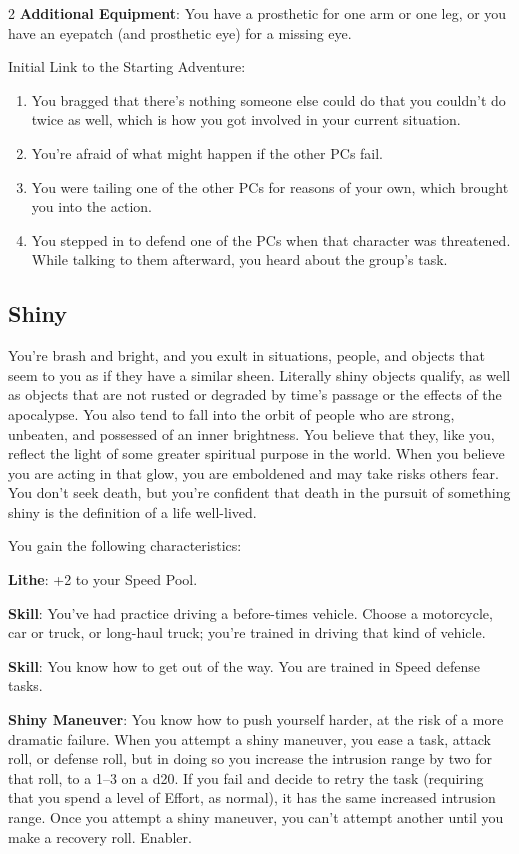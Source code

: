 \begin{multicols}{2}
\textbf{Additional Equipment}: You have a prosthetic for one arm or one leg, or you have an eyepatch (and prosthetic eye) for a missing eye.

Initial Link to the Starting Adventure:
\begin{enumerate}
\item  You bragged that there’s nothing someone else could do that you couldn’t do twice as well, which is how you got involved in your current situation.
\item  You’re afraid of what might happen if the other PCs fail.
\item  You were tailing one of the other PCs for reasons of your own, which brought you into the action.
\item  You stepped in to defend one of the PCs when that character was threatened. While talking to them afterward, you heard about the group’s task.
\end{enumerate}

\subsection{Shiny}

You’re brash and bright, and you exult in situations, people, and objects that seem to  you as if they have a similar sheen. Literally shiny objects qualify, as well as objects that are not rusted or degraded by time’s passage or the effects of the apocalypse. You also tend to fall into the orbit of people who are strong, unbeaten, and possessed of an inner brightness. You believe that they, like you, reflect the light of some greater spiritual purpose in the world. When you believe you are acting in that glow, you are emboldened and may take risks others fear. You don’t seek death, but you’re confident that death in the pursuit of something shiny is the definition of a life well-lived.

You gain the following characteristics:

\textbf{Lithe}: +2 to your Speed Pool.

\textbf{Skill}: You’ve had practice driving a before-times vehicle. Choose a motorcycle, car or truck, or long-haul truck; you’re trained in driving that kind of vehicle. 

\textbf{Skill}: You know how to get out of the way. You are trained in Speed defense tasks.

\textbf{Shiny Maneuver}: You know how to push yourself harder, at the risk of a more dramatic failure. When you attempt a shiny maneuver, you ease a task, attack roll, or defense roll, but in doing so you increase the intrusion range by two for that roll, to a 1–3 on a d20. If you fail and decide to retry the task (requiring that you spend a level of Effort, as normal), it has the same increased intrusion range. Once you attempt a shiny maneuver, you can’t attempt another until you make a recovery roll. Enabler.


\end{multicols}
